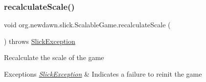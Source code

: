 \subsubsection{\texorpdfstring{recalculate\+Scale()}{recalculateScale()}}
{\footnotesize\ttfamily void org.\+newdawn.\+slick.\+Scalable\+Game.\+recalculate\+Scale (\begin{DoxyParamCaption}{ }\end{DoxyParamCaption}) throws \mbox{\hyperlink{classorg_1_1newdawn_1_1slick_1_1_slick_exception}{Slick\+Exception}}\hspace{0.3cm}{\ttfamily [inline]}}

Recalculate the scale of the game


\begin{DoxyExceptions}{Exceptions}
{\em \mbox{\hyperlink{classorg_1_1newdawn_1_1slick_1_1_slick_exception}{Slick\+Exception}}} & Indicates a failure to reinit the game \\
\hline
\end{DoxyExceptions}

